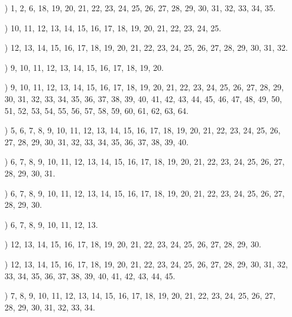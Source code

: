 \documentclass[a4paper,11pt]{article}
\numberwithin{equation}{section}
\begin{document}
\begin{itemize}
\item[\romannumeral32)] 1, 2, 6, 18, 19, 20, 21, 22, 23, 24, 25, 26, 27, 28,
  29, 30, 31, 32, 33, 34, 35.

\item[\romannumeral33)] 10, 11, 12, 13, 14, 15, 16, 17, 18, 19, 20, 21, 22,
  23, 24, 25.

\item[\romannumeral34)] 12, 13, 14, 15, 16, 17, 18, 19, 20, 21, 22, 23, 24,
  25, 26, 27, 28, 29, 30, 31, 32.

\item[\romannumeral35)] 9, 10, 11, 12, 13, 14, 15, 16, 17, 18, 19, 20.

\item[\romannumeral36)] 9, 10, 11, 12, 13, 14, 15, 16, 17, 18, 19, 20, 21,
  22, 23, 24, 25, 26, 27, 28, 29, 30, 31, 32, 33, 34, 35, 36, 37, 38, 39,
  40, 41, 42, 43, 44, 45, 46, 47, 48, 49, 50, 51, 52, 53, 54, 55, 56, 57,
  58, 59, 60, 61, 62, 63, 64.

\item[\romannumeral37)] 5, 6, 7, 8, 9, 10, 11, 12, 13, 14, 15, 16, 17, 18,
  19, 20, 21, 22, 23, 24, 25, 26, 27, 28, 29, 30, 31, 32, 33, 34, 35, 36,
  37, 38, 39, 40.

\item[\romannumeral38)] 6, 7, 8, 9, 10, 11, 12, 13, 14, 15, 16, 17, 18, 19,
  20, 21, 22, 23, 24, 25, 26, 27, 28, 29, 30, 31.

\item[\romannumeral39)] 6, 7, 8, 9, 10, 11, 12, 13, 14, 15, 16, 17, 18, 19,
  20, 21, 22, 23, 24, 25, 26, 27, 28, 29, 30.

\item[\romannumeral40)] 6, 7, 8, 9, 10, 11, 12, 13.

\item[\romannumeral41)] 12, 13, 14, 15, 16, 17, 18, 19, 20, 21, 22, 23, 24,
  25, 26, 27, 28, 29, 30.

\item[\romannumeral42)] 12, 13, 14, 15, 16, 17, 18, 19, 20, 21, 22, 23, 24,
  25, 26, 27, 28, 29, 30, 31, 32, 33, 34, 35, 36, 37, 38, 39, 40, 41, 42,
  43, 44, 45.

\item[\romannumeral43)] 7, 8, 9, 10, 11, 12, 13, 14, 15, 16, 17, 18, 19, 20,
  21, 22, 23, 24, 25, 26, 27, 28, 29, 30, 31, 32, 33, 34.

\end{itemize}
\end{document}
